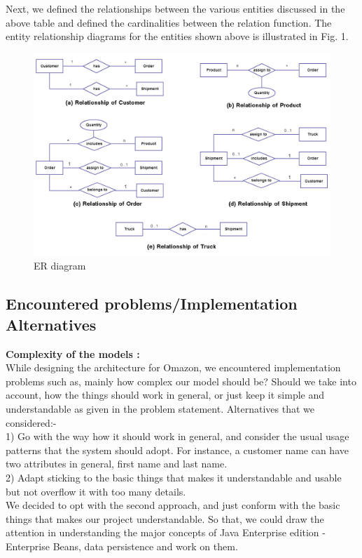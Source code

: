 \documentclass[twoside,colorbacktitle,accentcolor=tud1b]{tudexercise}
\begin{document}
Next, we defined the relationships between the various entities discussed in the above table and defined the cardinalities between the relation function. The entity relationship diagrams for the entities shown above is illustrated in Fig. 1.

\begin{figure}[h!]
  \centering
   \includegraphics[width=17cm]{associations}
   \caption{ER diagram}
\end{figure}

  \subsection{Encountered problems/Implementation Alternatives}
 \textbf{Complexity of the models :}\\
While designing the architecture for Omazon, we encountered implementation problems such as, mainly how complex our model should be? Should we take into account, how the things should work in general, or just keep it simple and understandable as given in the problem statement. Alternatives that we considered:-\\
1) Go with the way how it should work in general, and consider the usual usage patterns that the system should adopt. For instance, a customer name can have two attributes in general, first name and last name.\\
2) Adapt sticking to the basic things that makes it understandable and usable but not overflow it with too many details. \\
We decided to opt with the second approach, and just conform with the basic things that makes our project understandable. So that, we could draw the attention in understanding the major concepts of Java Enterprise edition - Enterprise Beans, data persistence and work on them.
\end{document}
